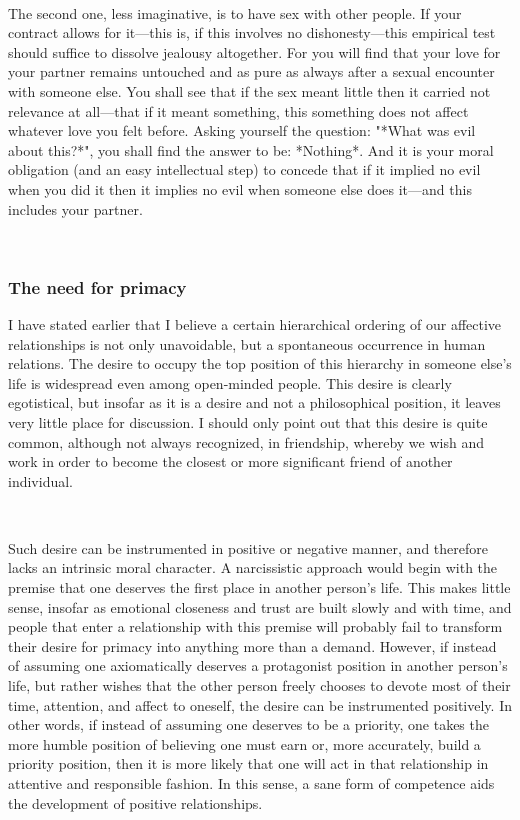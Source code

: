 \documentclass[a4paper, 12pt]{article}
\begin{document}
~

The second one, less imaginative, is to have sex with other people. If your
contract allows for it—this is, if this involves no dishonesty—this empirical
test should suffice to dissolve jealousy altogether. For you will find that
your love for your partner remains untouched and as pure as always after a
sexual encounter with someone else. You shall see that if the sex meant little
then it carried not relevance at all—that if it meant something, this something
does not affect whatever love you felt before. Asking yourself the question:
"*What was evil about this?*", you shall find the answer to be: *Nothing*. And
it is your moral obligation (and an easy intellectual step) to concede that if
it implied no evil when you did it then it implies no evil when someone else
does it---and this includes your partner.

~

\subsubsection{The need for primacy}

I have stated earlier that I believe a certain hierarchical ordering of our
affective relationships is not only unavoidable, but a spontaneous occurrence
in human relations. The desire to occupy the top position of this hierarchy in
someone else's life is widespread even among open-minded people. This desire is
clearly egotistical, but insofar as it is a desire and not a philosophical
position, it leaves very little place for discussion. I should only point out 
that this desire is quite common, although not always recognized, in friendship,
whereby we wish and work in order to become the closest or more significant friend 
of another individual.

~ 

Such desire can be instrumented in positive or negative manner, and therefore
lacks an intrinsic moral character. A narcissistic approach would begin
with the premise that one deserves the first place in another person's life.
This makes little sense, insofar as emotional closeness and trust are built
slowly and with time, and people that enter a relationship with this premise
will probably fail to transform their desire for primacy into anything more
than a demand. However, if instead of assuming one axiomatically deserves a
protagonist position in another person's life, but rather wishes that the other
person freely chooses to devote most of their time, attention, and affect to
oneself, the desire can be instrumented positively. In other words, if instead
of assuming one deserves to be a priority, one takes the more humble position
of believing one must earn or, more accurately, build a priority position,
then it is more likely that one will act in that relationship in attentive and
responsible fashion. In this sense, a sane form of competence aids the
development of positive relationships. 
\end{document}
